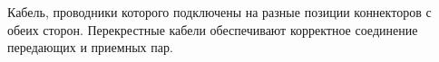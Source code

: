 Кабель, проводники которого подключены на разные позиции
коннекторов с обеих сторон. Перекрестные кабели обеспечивают корректное
соединение передающих и приемных пар.